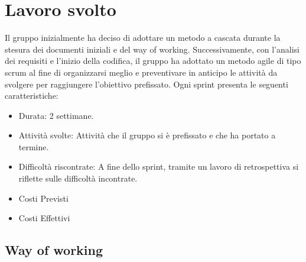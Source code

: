 \section{Lavoro svolto}
Il gruppo inizialmente ha deciso di adottare un metodo a cascata durante la stesura dei documenti iniziali e del way of working. 
Successivamente, con l'analisi dei requisiti e l'inizio della codifica, il gruppo ha adottato un metodo agile di tipo scrum al fine di organizzarsi meglio e preventivare in anticipo le attività da svolgere per raggiungere l'obiettivo prefissato.
Ogni sprint presenta le seguenti caratteristiche:
\begin{itemize}
    \item{Durata:} 2 settimane.
    \item{Attività svolte:} Attività che il gruppo si è prefissato e che ha portato a termine.
    \item{Difficoltà riscontrate:} A fine dello sprint, tramite un lavoro di retrospettiva si riflette sulle difficoltà incontrate.
    \item{Costi Previsti}
    \item{Costi Effettivi}
\end{itemize}

\subsection{Way of working}



